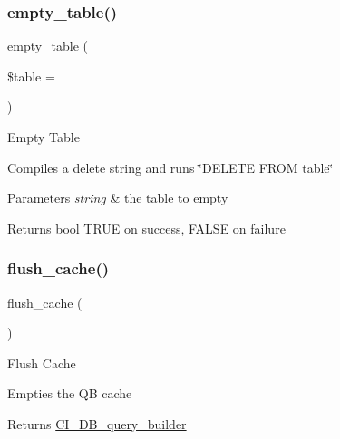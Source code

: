 \subsubsection{\texorpdfstring{empty\+\_\+table()}{empty\_table()}}
{\footnotesize\ttfamily empty\+\_\+table (\begin{DoxyParamCaption}\item[{}]{\$table = {\ttfamily \textquotesingle{}\textquotesingle{}} }\end{DoxyParamCaption})}

Empty Table

Compiles a delete string and runs \char`\"{}\+D\+E\+L\+E\+T\+E F\+R\+O\+M table\char`\"{}


\begin{DoxyParams}{Parameters}
{\em string} & the table to empty \\
\hline
\end{DoxyParams}
\begin{DoxyReturn}{Returns}
bool T\+R\+UE on success, F\+A\+L\+SE on failure 
\end{DoxyReturn}
\mbox{\label{class_c_i___d_b__query__builder_aa3c94d79d552f6e10277b01c447ebbb6}} 
\subsubsection{\texorpdfstring{flush\+\_\+cache()}{flush\_cache()}}
{\footnotesize\ttfamily flush\+\_\+cache (\begin{DoxyParamCaption}{ }\end{DoxyParamCaption})}

Flush Cache

Empties the QB cache

\begin{DoxyReturn}{Returns}
\mbox{\hyperlink{class_c_i___d_b__query__builder}{C\+I\+\_\+\+D\+B\+\_\+query\+\_\+builder}} 
\end{DoxyReturn}
\mbox{\label{class_c_i___d_b__query__builder_a91f5f004ed8e2237a4decc5d23ac3457}} 
